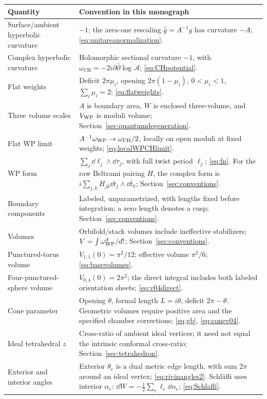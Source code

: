 \begingroup\small
\setlength{\LTpost}{4pt}
\begin{longtable}{@{}>{\raggedright\arraybackslash}p{}
 >{\raggedright\arraybackslash}p{}@{}}
\toprule
Quantity & Convention in this monograph\\
\midrule
\endhead
Surface/ambient hyperbolic curvature & $-1$; the area-one rescaling $\widehat g=A^{-1}g$ has curvature $-A$; \eqref{eq:unitareanormalization}.\\
Complex hyperbolic curvature & Holomorphic sectional curvature $-1$, with $\omega_{\mathrm{CH}}=-2i\partial\bar\partial\log\mathcal A$; \eqref{eq:CHpotential}.\\
Flat weights & Deficit $2\pi\mu_i$, opening $2\pi(1-\mu_i)$, $0<\mu_i<1$, $\sum_i\mu_i=2$; \eqref{eq:flatweights}.\\
Three volume scales & $A$ is boundary area, $W$ is enclosed three-volume, and $V_{\mathrm{WP}}$ is moduli volume; Section~\ref{sec:quantumdegeneration}.\\
Flat WP limit & $A^{-1}\omega_{\mathrm{WP}}\to\omega_{\mathrm{CH}}/2$, locally on open moduli at fixed weights; \eqref{eq:localWPCHlimit}.\\
WP form & $\sum_j\dd\ell_j\wedge\dd\tau_j$, with full twist period $\ell_j$; \eqref{eq:fn}. For the raw Beltrami pairing $H$, the complex form is $i\sum_{j,k}H_{j\bar k}\dd t_j\wedge\dd\bar t_k$; Section~\ref{sec:conventions}.\\
Boundary components & Labeled, unparametrized, with lengths fixed before integration; a zero length denotes a cusp; Section~\ref{sec:conventions}.\\
Volumes & Orbifold/stack volumes include ineffective stabilizers; $V=\int\omega_{\mathrm{WP}}^{d}/d!$; Section~\ref{sec:conventions}.\\
Punctured-torus volume & $V_{1,1}(0)=\pi^2/12$; effective volume $\pi^2/6$; \eqref{eq:basevolumes}.\\
Four-punctured-sphere volume & $V_{0,4}(0)=2\pi^2$; the direct integral includes both labeled orientation sheets; \eqref{eq:v04direct}.\\
Cone parameter & Opening $\theta$, formal length $L=i\theta$, deficit $2\pi-\theta$. Geometric volumes require positive area and the specified chamber corrections; \eqref{eq:gb}, \eqref{eq:conev04}.\\
Ideal tetrahedral $z$ & Cross-ratio of ambient ideal vertices; it need not equal the intrinsic conformal cross-ratio; Section~\ref{sec:tetrahedron}.\\
Exterior and interior angles & Exterior $\theta_e$ is a dual metric edge length, with sum $2\pi$ around an ideal vertex; \eqref{eq:rivinangles2}. Schl\"afli uses interior $\alpha_e$: $\dd W=-\frac12\sum_e\ell_e\dd\alpha_e$; \eqref{eq:Schlafli}.\\

\end{longtable}
